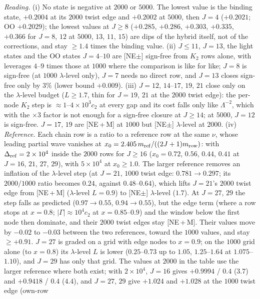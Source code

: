 \documentclass[aps,prl,onecolumn,superscriptaddress,nofootinbib]{revtex4-2}
\begin{document}
\emph{Reading.} (i) No state is negative at $2000$ or $5000$. The lowest value is the binding state, $+0.2004$ at its $2000$
twist edge and $+0.2002$ at $5000$, then $J=4$ ($+0.2021$; OO $+0.2029$); the lowest values at $J\ge8$ ($+0.285$, $+0.286$, $+0.303$,
$+0.335$, $+0.366$ for $J=8$, $12$ at $5000$, $13$, $11$, $15$) are dips of the hybrid itself, not of the corrections, and stay
$\ge1.4$ times the binding value. (ii) $J\le11$, $J=13$, the light states and the OO states $J=4$--$10$ are [NE$\pm$] sign-free from
$K_2$ rows alone, with leverages $4$--$9$ times those at $1000$ where the comparison is like for like; $J=8$ is sign-free (at $1000$ $\lambda$-level only), $J=7$ needs no direct row, and $J=13$ closes sign-free only by $3\%$ (lower bound $+0.009$). (iii) $J=12$,
$14$--$17$, $19$, $21$ close only on the $\lambda$-level budget ($L\ge1.7$, thin for $J=19$, $21$ at the $2000$ twist edge): the
per-node $K_2$ step is $\approx1$--$4\times10^3c_2$ at every gap and its cost falls only like $\Lambda^{-2}$, which with the
$\times3$ factor is not enough for a sign-free closure at $J\ge14$; at $5000$, $J=12$ is sign-free. $J=17$, $19$ are [NE\,+\,M] at
$1000$ but [NE$\pm$] $\lambda$-level at $2000$. (iv) \emph{Reference.} Each chain row is a ratio to a reference row at
the same $\nu$, whose leading partial wave vanishes at $x_0=2.405\,m_{\rm ref}/((2J+1)m_{\rm row})$: with $\Delta_{\rm ref}=2\times10^4$
inside the $2000$ rows for $J\ge16$ ($x_0=0.72$, $0.56$, $0.44$, $0.41$ at $J=16$, $21$, $27$, $29$), with $5\times10^4$ at $x_0\ge1.0$.
The larger reference removes an inflation of the $\lambda$-level step (at $J=21$, $1000$ twist edge: $0.781\to0.297$; its $2000/1000$
ratio becomes $0.24$, against $0.48$--$0.64$), which lifts $J=21$'s $2000$ twist edge from [NE\,+\,M] ($\lambda$-level $L=0.9$) to
[NE$\pm$] $\lambda$-level ($1.7$). At $J=27$, $29$ the step falls as predicted ($0.97\to0.55$, $0.94\to0.55$), but the edge term
(where a row stops at $x=0.8$; $|\Gamma|\approx10^4c_2$ at $x=0.85$--$0.9$) and the window below the first node then dominate, and their $2000$
twist edges stay [NE\,+\,M]. Their values move by $-0.02$ to $-0.03$
between the two references, toward the $1000$ values, and stay $\ge+0.91$. $J=27$ is graded on a grid with edge nodes to $x=0.9$; on
the $1000$ grid alone (to $x=0.8$) its $\lambda$-level $L$ is lower ($0.25$--$0.73$ up to $1.05$, $1.25$--$1.64$ at $1.075$--$1.10$), and
$J=29$ has only that grid. The values at $2000$ in the table use the larger reference where both exist; with $2\times10^4$, $J=16$
gives $+0.9994$ / $0.4$ ($3.7$) and $+0.9418$ / $0.4$ ($4.4$), and $J=27$, $29$ give $+1.024$ and $+1.028$ at the $1000$ twist edge (own-row
\end{document}
